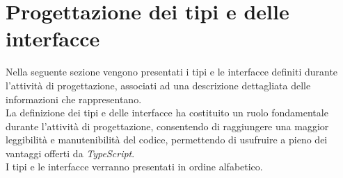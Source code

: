 \section{Progettazione dei tipi e delle interfacce}
Nella seguente sezione vengono presentati i tipi e le interfacce definiti durante l'attività di progettazione, associati ad una descrizione dettagliata
delle informazioni che rappresentano. \\
La definizione dei tipi e delle interfacce ha costituito un ruolo fondamentale durante l'attività di progettazione, consentendo di raggiungere una maggior
leggibilità e manutenibilità del codice, permettendo di usufruire a pieno dei vantaggi offerti da \textit{TypeScript}. \\
I tipi e le interfacce verranno presentati in ordine alfabetico.

